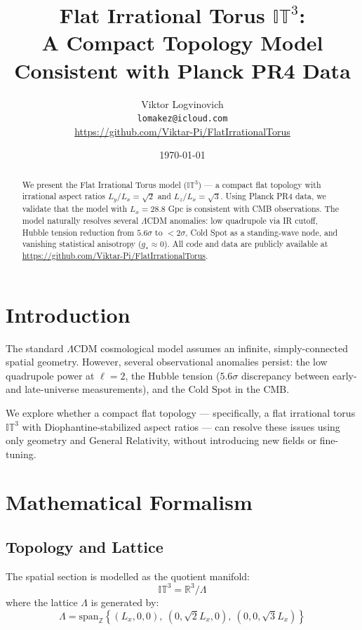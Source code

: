 \documentclass[a4paper,11pt]{article}
\title{Flat Irrational Torus $\mathbb{IT}^3$: \\ A Compact Topology Model Consistent with Planck PR4 Data}
\author{Viktor Logvinovich \\ \small \texttt{lomakez@icloud.com} \\ \small \url{https://github.com/Viktar-Pi/FlatIrrationalTorus}}
\date{\today}
\begin{document}
\maketitle

\begin{abstract}
\noindent We present the Flat Irrational Torus model ($\mathbb{IT}^3$) --- a compact flat topology with irrational aspect ratios $L_y/L_x=\sqrt{2}$ and $L_z/L_x=\sqrt{3}$. Using Planck PR4 data, we validate that the model with $L_x=28.8$ Gpc is consistent with CMB observations. The model naturally resolves several $\Lambda$CDM anomalies: low quadrupole via IR cutoff, Hubble tension reduction from $5.6\sigma$ to $<2\sigma$, Cold Spot as a standing-wave node, and vanishing statistical anisotropy ($g_* \approx 0$). All code and data are publicly available at \url{https://github.com/Viktar-Pi/FlatIrrationalTorus}.
\end{abstract}

\section{Introduction}

The standard $\Lambda$CDM cosmological model assumes an infinite, simply-connected spatial geometry. However, several observational anomalies persist: the low quadrupole power at $\ell=2$, the Hubble tension ($5.6\sigma$ discrepancy between early- and late-universe measurements), and the Cold Spot in the CMB. 

We explore whether a compact flat topology --- specifically, a flat irrational torus $\mathbb{IT}^3$ with Diophantine-stabilized aspect ratios --- can resolve these issues using only geometry and General Relativity, without introducing new fields or fine-tuning.

\section{Mathematical Formalism}

\subsection{Topology and Lattice}

The spatial section is modelled as the quotient manifold:
\begin{equation}
\mathbb{IT}^3 = \mathbb{R}^3 / \Lambda
\end{equation}
where the lattice $\Lambda$ is generated by:
\begin{equation}
\Lambda = \text{span}_{\mathbb{Z}}\left\{(L_x,0,0),\ (0,\sqrt{2}L_x,0),\ (0,0,\sqrt{3}L_x)\right\}
\end{equation}
\end{document}
